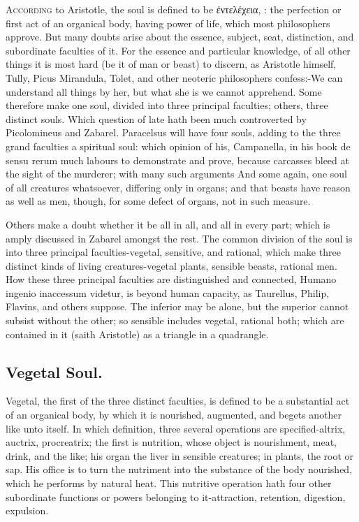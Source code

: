 {\lettrine{A}{ccording} to Aristotle, the soul is defined to be \textgreek{ἐντελέχεια},
: the perfection or first act of an organical body, having
power of life, which most philosophers approve. But many doubts
arise about the essence, subject, seat, distinction, and subordinate
faculties of it. For the essence and particular knowledge, of all other
things it is most hard (be it of man or beast) to discern, as
Aristotle himself, Tully, Picus Mirandula, Tolet,
and other neoteric philosophers confess:-We can understand all
things by her, but what she is we cannot apprehend. Some therefore make
one soul, divided into three principal faculties; others, three
distinct souls. Which question of late hath been much controverted by
Picolomineus and Zabarel.  Paracelsus will have four souls, adding
to the three grand faculties a spiritual soul: which opinion of his,
Campanella, in his book de sensu rerum much labours to demonstrate
and prove, because carcasses bleed at the sight of the murderer; with
many such arguments And some again, one soul of all creatures
whatsoever, differing only in organs; and that beasts have reason as
well as men, though, for some defect of organs, not in such measure.

Others make a doubt whether it be all in all, and all in every part;
which is amply discussed in Zabarel amongst the rest. The common
division of the soul is into three principal faculties-vegetal,
sensitive, and rational, which make three distinct kinds of living
creatures-vegetal plants, sensible beasts, rational men. How these
three principal faculties are distinguished and connected, Humano
ingenio inaccessum videtur, is beyond human capacity, as 
Taurellus, Philip, Flavins, and others suppose. The inferior may be
alone, but the superior cannot subsist without the other; so sensible
includes vegetal, rational both; which are contained in it (saith
Aristotle)  as a triangle in a quadrangle.
\subsection{Vegetal Soul.}
Vegetal, the first of the three distinct faculties, is
defined to be a substantial act of an organical body, by which it is
nourished, augmented, and begets another like unto itself. In which
definition, three several operations are specified-altrix, auctrix,
procreatrix; the first is nutrition, whose object is nourishment,
meat, drink, and the like; his organ the liver in sensible creatures;
in plants, the root or sap. His office is to turn the nutriment into
the substance of the body nourished, which he performs by natural heat.
This nutritive operation hath four other subordinate functions or
powers belonging to it-attraction, retention, digestion, expulsion.
}
